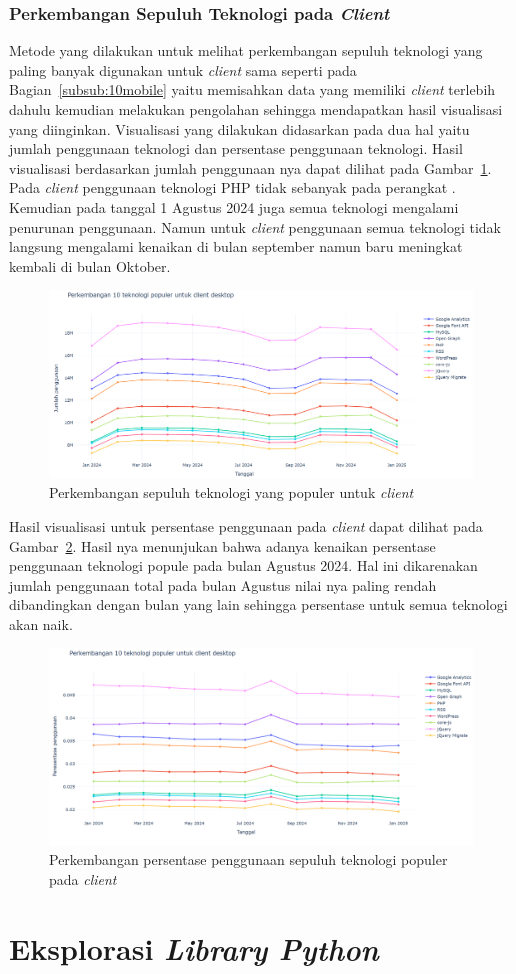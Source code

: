 \subsubsection{Perkembangan Sepuluh Teknologi pada \textit{Client} \desktop}

Metode yang dilakukan untuk melihat perkembangan sepuluh teknologi yang paling banyak digunakan untuk \textit{client} \desktop sama seperti pada Bagian~\ref{subsub:10mobile} yaitu memisahkan data yang memiliki \textit{client} \desktop terlebih dahulu kemudian melakukan pengolahan sehingga mendapatkan hasil visualisasi yang diinginkan. Visualisasi yang dilakukan didasarkan pada dua hal yaitu jumlah penggunaan teknologi dan persentase penggunaan teknologi. Hasil visualisasi berdasarkan jumlah penggunaan nya dapat dilihat pada Gambar~\ref{fig:10dekstop}. Pada \textit{client} \desktop penggunaan teknologi PHP tidak sebanyak pada perangkat \mobile. Kemudian pada tanggal 1 Agustus 2024 juga semua teknologi mengalami penurunan penggunaan. Namun untuk \textit{client} \desktop penggunaan semua teknologi tidak langsung mengalami kenaikan di bulan september namun baru meningkat kembali di bulan Oktober.
\begin{figure}[H]
    \centering
    \includegraphics[width=0.7\linewidth]{Gambar/Perkembangan 10 teknologi pada desktop.png}
    \caption{Perkembangan sepuluh teknologi yang populer untuk \textit{client} \desktop}
    \label{fig:10dekstop}
\end{figure}

Hasil visualisasi untuk persentase penggunaan pada \textit{client} \desktop dapat dilihat pada Gambar~\ref{fig:persentasedesktop}. Hasil nya menunjukan bahwa adanya kenaikan persentase penggunaan teknologi popule pada bulan Agustus 2024. Hal ini dikarenakan jumlah penggunaan total pada bulan Agustus nilai nya paling rendah dibandingkan dengan bulan yang lain sehingga persentase untuk semua teknologi akan naik.
\begin{figure}[H]
    \centering
    \includegraphics[width=0.7\linewidth]{Gambar/Perkembangan persentase pada desktop.png}
    \caption{Perkembangan persentase penggunaan sepuluh teknologi populer pada \textit{client} \desktop}
    \label{fig:persentasedesktop}
\end{figure}

\section{Eksplorasi \textit{Library Python}}
\label{sec:library}